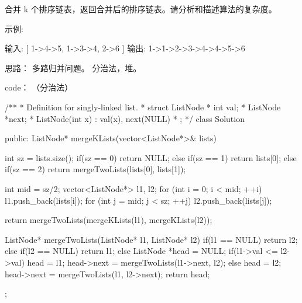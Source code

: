 合并 k 个排序链表，返回合并后的排序链表。请分析和描述算法的复杂度。

示例:

输入:
[
  1->4->5,
  1->3->4,
  2->6
]
输出: 1->1->2->3->4->4->5->6














思路：
多路归并问题。
分治法，堆。

code： （分治法）

/**
 * Definition for singly-linked list.
 * struct ListNode {
 *     int val;
 *     ListNode *next;
 *     ListNode(int x) : val(x), next(NULL) {}
 * };
 */
class Solution {
public:
    ListNode* mergeKLists(vector<ListNode*>& lists) {
        int sz = lists.size();
        if(sz == 0) return NULL;
        else if(sz == 1) return lists[0];
        else if(sz == 2) return mergeTwoLists(lists[0], lists[1]);

        int mid = sz/2;
        vector<ListNode*> l1, l2;
        for (int i = 0; i < mid; ++i) l1.push_back(lists[i]);
        for (int j = mid; j < sz; ++j) l2.push_back(lists[j]);

        return mergeTwoLists(mergeKLists(l1), mergeKLists(l2));
    }
    ListNode* mergeTwoLists(ListNode* l1, ListNode* l2) {
        if(l1 == NULL) return l2;
        else if(l2 == NULL) return l1;
        else {
            ListNode *head = NULL;
            if(l1->val <= l2->val) {
                head = l1;
                head->next = mergeTwoLists(l1->next, l2);
            } else {
                head = l2;
                head->next = mergeTwoLists(l1, l2->next);
            }
            return head;
        }
    }
};
